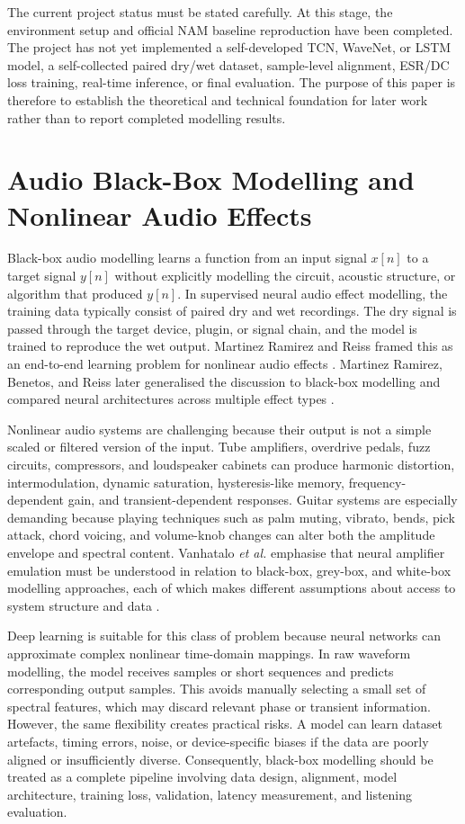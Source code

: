 \documentclass[conference]{IEEEtran}
\begin{document}
The current project status must be stated carefully. At this stage, the environment setup and official NAM baseline reproduction have been completed. The project has not yet implemented a self-developed TCN, WaveNet, or LSTM model, a self-collected paired dry/wet dataset, sample-level alignment, ESR/DC loss training, real-time inference, or final evaluation. The purpose of this paper is therefore to establish the theoretical and technical foundation for later work rather than to report completed modelling results.

\section{Audio Black-Box Modelling and Nonlinear Audio Effects}

Black-box audio modelling learns a function from an input signal $x[n]$ to a target signal $y[n]$ without explicitly modelling the circuit, acoustic structure, or algorithm that produced $y[n]$. In supervised neural audio effect modelling, the training data typically consist of paired dry and wet recordings. The dry signal is passed through the target device, plugin, or signal chain, and the model is trained to reproduce the wet output. Martinez Ramirez and Reiss framed this as an end-to-end learning problem for nonlinear audio effects \cite{ramirez2018nonlinear}. Martinez Ramirez, Benetos, and Reiss later generalised the discussion to black-box modelling and compared neural architectures across multiple effect types \cite{ramirez2020blackbox}.

Nonlinear audio systems are challenging because their output is not a simple scaled or filtered version of the input. Tube amplifiers, overdrive pedals, fuzz circuits, compressors, and loudspeaker cabinets can produce harmonic distortion, intermodulation, dynamic saturation, hysteresis-like memory, frequency-dependent gain, and transient-dependent responses. Guitar systems are especially demanding because playing techniques such as palm muting, vibrato, bends, pick attack, chord voicing, and volume-knob changes can alter both the amplitude envelope and spectral content. Vanhatalo \emph{et al.} emphasise that neural amplifier emulation must be understood in relation to black-box, grey-box, and white-box modelling approaches, each of which makes different assumptions about access to system structure and data \cite{vanhatalo2022review}.

Deep learning is suitable for this class of problem because neural networks can approximate complex nonlinear time-domain mappings. In raw waveform modelling, the model receives samples or short sequences and predicts corresponding output samples. This avoids manually selecting a small set of spectral features, which may discard relevant phase or transient information. However, the same flexibility creates practical risks. A model can learn dataset artefacts, timing errors, noise, or device-specific biases if the data are poorly aligned or insufficiently diverse. Consequently, black-box modelling should be treated as a complete pipeline involving data design, alignment, model architecture, training loss, validation, latency measurement, and listening evaluation.
\end{document}

